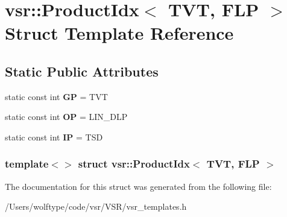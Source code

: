 \hypertarget{structvsr_1_1_product_idx_3_01_t_v_t_00_01_f_l_p_01_4}{\section{vsr\-:\-:Product\-Idx$<$ T\-V\-T, F\-L\-P $>$ Struct Template Reference}
\label{structvsr_1_1_product_idx_3_01_t_v_t_00_01_f_l_p_01_4}
}
\subsection*{Static Public Attributes}
\begin{DoxyCompactItemize}
\item 
\hypertarget{structvsr_1_1_product_idx_3_01_t_v_t_00_01_f_l_p_01_4_abfb2e1ad38e279011fbaf0422450a90c}{static const int {\bfseries G\-P} = T\-V\-T}\label{structvsr_1_1_product_idx_3_01_t_v_t_00_01_f_l_p_01_4_abfb2e1ad38e279011fbaf0422450a90c}

\item 
\hypertarget{structvsr_1_1_product_idx_3_01_t_v_t_00_01_f_l_p_01_4_a81b6006d4f5cf4768779996b72e3cf53}{static const int {\bfseries O\-P} = L\-I\-N\-\_\-\-D\-L\-P}\label{structvsr_1_1_product_idx_3_01_t_v_t_00_01_f_l_p_01_4_a81b6006d4f5cf4768779996b72e3cf53}

\item 
\hypertarget{structvsr_1_1_product_idx_3_01_t_v_t_00_01_f_l_p_01_4_a0ad7360ca2be75a5b02495c45f14edd3}{static const int {\bfseries I\-P} = T\-S\-D}\label{structvsr_1_1_product_idx_3_01_t_v_t_00_01_f_l_p_01_4_a0ad7360ca2be75a5b02495c45f14edd3}

\end{DoxyCompactItemize}
\subsubsection*{template$<$$>$ struct vsr\-::\-Product\-Idx$<$ T\-V\-T, F\-L\-P $>$}



The documentation for this struct was generated from the following file\-:\begin{DoxyCompactItemize}
\item 
/\-Users/wolftype/code/vsr/\-V\-S\-R/vsr\-\_\-templates.\-h\end{DoxyCompactItemize}
